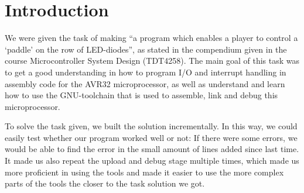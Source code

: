 \section{Introduction}

We were given the task of making ``a program which enables a player to
control a `paddle' on the row of LED-diodes'', as stated in the
compendium given in the course Microcontroller System Design (TDT4258).
The main goal of this task was to get a good understanding in how to
program I/O and interrupt handling in assembly code for the AVR32
microprocessor, as well as understand and learn how to use the
GNU-toolchain that is used to assemble, link and debug this
microprocessor.

To solve the task given, we built the solution incrementally. In this
way, we could easily test whether our program worked well or not: If
there were some errors, we would be able to find the error in the small
amount of lines added since last time. It made us also repeat the upload
and debug stage multiple times, which made us more proficient in using
the tools and made it easier to use the more complex parts of the tools
the closer to the task solution we got. 

